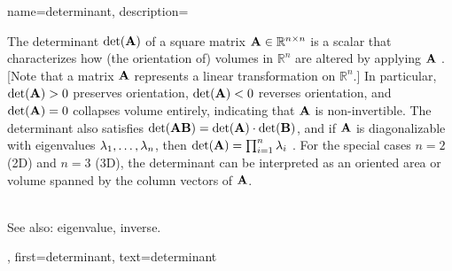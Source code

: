 {name={determinant},
 description={The determinant $\det({\bf A})$ of a square matrix 
 	${\bf A} \in \mathbb{R}^{n \times n}$ is a scalar that characterizes how (the orientation of) 
 	volumes in $\mathbb{R}^n$ are altered by applying ${\bf A}$ \cite{GolubVanLoanBook,Strang2007}. 
 	[Note that a matrix ${\bf A}$ represents a linear transformation on $\mathbb{R}^{n}$.] 
 	In particular, $\det({\bf A}) > 0$ preserves orientation, $\det({\bf A}) < 0$ reverses orientation, 
 	and $\det({\bf A}) = 0$ collapses volume entirely, indicating that ${\bf A}$ is non-invertible. 
 	The determinant also satisfies $\det({\bf A} {\bf B}) = \det({\bf A}) \cdot \det({\bf B})$, and if ${\bf A}$ is 
 	diagonalizable with \glspl{eigenvalue} $\lambda_{1}, \ldots, \lambda_{n}$, then $\det({\bf A}) = \prod_{i=1}^{n} \lambda_{i}$ \cite{HornMatAnalysis}.
    For the special cases $n=2$ (2D) and $n=3$ (3D), the determinant can be interpreted as an oriented 
    area or volume spanned by the column vectors of ${\bf A}$.
    \begin{figure} 
    	\begin{center}
	\end{center}
	\end{figure}
		\\ 
		See also: \gls{eigenvalue}, \gls{inverse}.
	},
	first={determinant},
	text={determinant}
}

